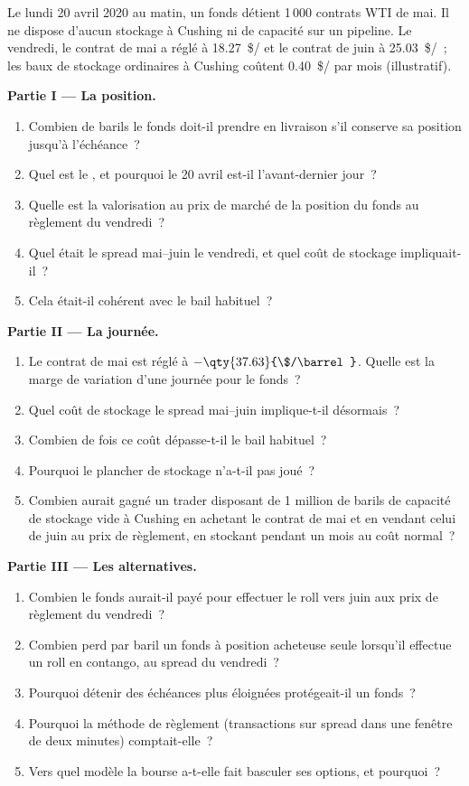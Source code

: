 \begin{problem}\label{pb:m3:crude-oil:1}
Le lundi 20 avril 2020 au matin, un fonds détient 1\,000 contrats WTI de mai. Il ne dispose
d'aucun stockage à Cushing ni de capacité sur un pipeline. Le vendredi, le contrat de mai a réglé
à \qty{18.27}{\$/\barrel} et le contrat de juin à \qty{25.03}{\$/\barrel}~; les baux de stockage
ordinaires à Cushing coûtent \qty{0.40}{\$/\barrel} par mois (illustratif).

\medskip\noindent\textbf{Partie I --- La position.}
\begin{enumerate}
\item Combien de barils le fonds doit-il prendre en livraison s'il conserve sa position jusqu'à l'échéance~?
\item Quel est le , et pourquoi le 20 avril est-il l'avant-dernier jour~?
\item Quelle est la valorisation au prix de marché de la position du fonds au règlement du vendredi~?
\item Quel était le spread mai--juin le vendredi, et quel coût de stockage impliquait-il~?
\item Cela était-il cohérent avec le bail habituel~?
\end{enumerate}

\medskip\noindent\textbf{Partie II --- La journée.}
\begin{enumerate}[resume]
\item Le contrat de mai est réglé à $-\qty{37.63}{\$/\barrel}$. Quelle est la
marge de variation d'une journée pour le fonds~?
\item Quel coût de stockage le spread mai--juin implique-t-il désormais~?
\item Combien de fois ce coût dépasse-t-il le bail habituel~?
\item Pourquoi le plancher de stockage n'a-t-il pas joué~?
\item Combien aurait gagné un trader disposant de 1 million de barils de capacité de stockage vide à Cushing
en achetant le contrat de mai et en vendant celui de juin au prix de règlement, en stockant pendant un mois au coût normal~?
\end{enumerate}

\medskip\noindent\textbf{Partie III --- Les alternatives.}
\begin{enumerate}[resume]
\item Combien le fonds aurait-il payé pour effectuer le roll vers juin aux prix de règlement du vendredi~?
\item Combien perd par baril un fonds à position acheteuse seule lorsqu'il effectue un roll en contango, au spread du vendredi~?
\item Pourquoi détenir des échéances plus éloignées protégeait-il un fonds~?
\item Pourquoi la méthode de règlement (transactions sur spread dans une fenêtre de deux minutes) comptait-elle~?
\item Vers quel modèle la bourse a-t-elle fait basculer ses options, et pourquoi~?
\end{enumerate}


\end{problem}
